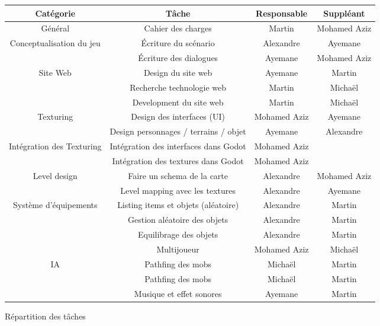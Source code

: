 \begin{figure}[H]
    \centering
    \begin{tabular}{|c|c|c|c|}
        \hline
        \bfseries{Cat\'egorie} & \bfseries{T\^ache} & \bfseries{Responsable} & \bfseries{Suppl\'eant} \\
        \hline\hline
        G\'en\'eral & Cahier des charges & Martin & Mohamed Aziz \\
        \hline\hline
        \multirow{2}{*}{Conceptualisation du jeu} & \'Ecriture du sc\'enario & Alexandre & Ayemane \\
        \cline{2-4}
        & \'Ecriture des dialogues & Ayemane  & Mohamed Aziz \\
        \hline\hline
        \multirow{3}{*}{Site Web} & Design du site web & Ayemane & Martin \\
        \cline{2-4}
        & Recherche technologie web & Martin & Michaël \\
        \cline{2-4}
        & Development du site web & Martin & Michaël \\
        \hline\hline
        \multirow{2}{*}{Texturing} & Design des interfaces (UI) & Mohamed Aziz & Ayemane \\
        \cline{2-4}
        & Design personnages / terrains / objet & Ayemane & Alexandre \\
        \hline\hline
        \multirow{2}{*}{Intégration des Texturing} & Int\'egration des interfaces dans Godot & Mohamed Aziz &  \\
        \cline{2-4}
        & Int\'egration des textures dans Godot & Mohamed Aziz & \\
        \hline\hline
        \multirow{2}{*}{Level design} & Faire un schema de la carte & Alexandre & Mohamed Aziz \\
        \cline{2-4}
        &Level mapping avec les textures & Alexandre & Ayemane \\
        \hline\hline
        \multirow{3}{*}{Système d'équipements} & Listing items et objets (al\'eatoire) & Alexandre & Martin \\
        \cline{2-4}
        & Gestion al\'eatoire des objets & Alexandre & Martin \\
        \cline{2-4}
        & Equilibrage des objets & Alexandre & Martin \\
        \hline\hline
        & Multijoueur & Mohamed Aziz & Michaël \\
        \hline\hline
        \multirow{2}{*}{IA} & Pathfing des mobs & Michaël & Martin \\
        \cline{2-4}
        & Pathfing des mobs & Michaël & Martin \\
        \hline\hline
        & Musique et effet sonores & Ayemane & Martin \\
        \hline


    \end{tabular}
    \caption{R\'epartition des tâches}
    \label{fig:repartition_des_taches}
\end{figure}


